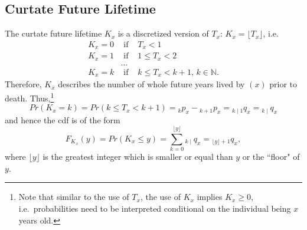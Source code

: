 \documentclass[11pt,fleqn,oneside]{book}
\begin{document}
\subsection*{Curtate Future Lifetime}
The curtate future lifetime $K_x$ is a discretized version of $T_x$: $K_x = \lfloor T_x \rfloor$, i.e.\
\begin{eqnarray*}
K_x = 0 & \text{ if } & T_x < 1\\
K_x = 1 & \text{ if } & 1\leq  T_x < 2\\
&...&\\
K_x = k & \text{ if } & k \leq T_x < k+1,\, k \in {\mathbb N}.
\end{eqnarray*}
Therefore, $K_x$ describes the number of whole future years lived by $(x)$ prior to death.
Thus,\footnote{Note that similar to the use of $T_x$, the use of $K_x$ implies $K_x\geq0$, i.e.\ probabilities need to be interpreted conditional on the individual being $x$ years old.} 
$$
Pr(K_x = k) = Pr(k \leq T_x < k+1) = {_kp_x} - {_{k+1}p_x} = {_{k\mid 1}q_x} = {_{k\mid}q_x}
$$
and hence the cdf is of the form
$$
F_{K_x}(y) = Pr(K_x \leq y) = \sum_{k=0}^{\lfloor y \rfloor} {_{k\mid}q_x} = {_{\lfloor y \rfloor + 1}q_x},
$$
where $\lfloor y \rfloor$ is the greatest integer which is smaller or equal than $y$ or the ``floor" of $y$. 
\end{document}
